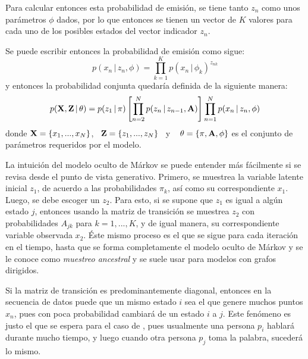 Para calcular entonces esta probabilidad de emisión, se tiene tanto $z_n$ como unos parámetros $\phi$ dados, por lo que entonces se tienen un vector de $K$ valores para cada uno de los posibles estados del vector indicador $z_n$.

Se puede escribir entonces la probabilidad de emisión como sigue:
\begin{equation}
p(x_n \,|\, z_n, \phi) = \prod_{k=1}^K p(x_n \,|\, \phi_k) ^ {z_{nk}}
\label{eqn:2-10}
\end{equation}
y entonces la probabilidad conjunta quedaría definida de la siguiente manera:
\begin{equation}
p(\textbf{X}, \textbf{Z} \,|\, \theta) 
= p(z_1 \,|\, \pi) \left[ \prod_{n=2}^N p(z_n \,|\, z_{n-1}, \textbf{A}) \right]
        \prod_{n=1}^N p(x_n \,|\, z_n, \phi)
\label{eqn:2-11}
\end{equation}
donde $\textbf{X} = \lbrace x_1, ..., x_N \rbrace$,~ $\textbf{Z} = \lbrace z_1, ..., z_N \rbrace$~ y ~ $\theta = \lbrace \pi, \textbf{A}, \phi \rbrace$ es el conjunto de parámetros requeridos por el modelo.

La intuición del modelo oculto de Márkov se puede entender más fácilmente si se revisa desde el punto de vista generativo. Primero, se muestrea la variable latente inicial $z_1$, de acuerdo a las probabilidades $\pi_k$, así como su correspondiente $x_1$. Luego, se debe escoger un $z_2$. Para esto, si se supone que $z_1$ es igual a algún estado $j$, entonces usando la matriz de transición se muestrea $z_2$ con probabilidades $A_{jk}$ para $k = 1, ..., K$, y de igual manera, su correspondiente variable observada $x_2$. Éste mismo proceso es el que se sigue para cada iteración en el tiempo, hasta que se forma completamente el modelo oculto de Márkov y se le conoce como \textit{muestreo ancestral} y se suele usar para modelos con grafos dirigidos.

Si la matriz de transición es predominantemente diagonal, entonces en la secuencia de datos puede que un mismo estado $i$ sea el que genere muchos puntos $x_n$, pues con poca probabilidad cambiará de un estado $i$ a $j$. Este fenómeno es justo el que se espera para el caso de \sd, pues usualmente una persona $p_i$ hablará durante mucho tiempo, y luego cuando otra persona $p_j$ toma la palabra, sucederá lo mismo.